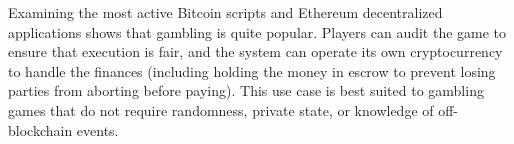 Examining the most active Bitcoin scripts and Ethereum decentralized applications shows that gambling is quite popular. Players can audit the game to ensure that execution is fair, and the system can operate its own cryptocurrency to handle the finances (including holding the money in escrow to prevent losing parties from aborting before paying). This use case is best suited to gambling games that do not require randomness, private state, or knowledge of off-blockchain events.





